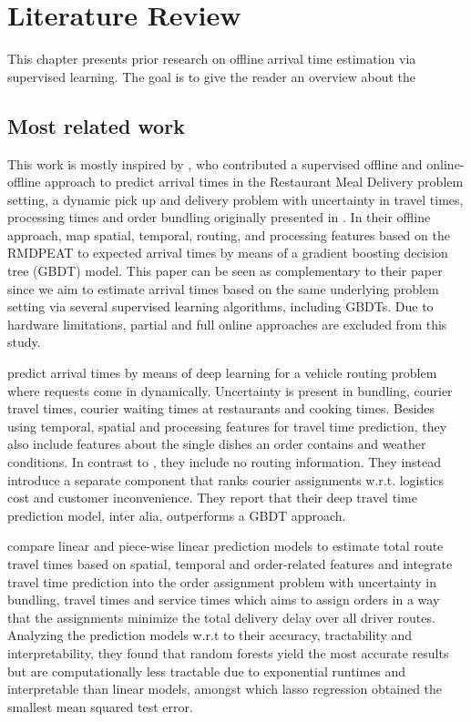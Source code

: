 \chapter{Literature Review}

This chapter presents prior research on offline arrival time estimation via supervised learning. The goal is to give the reader an overview about the  


\section{Most related work}
This work is mostly inspired by \cite{Hildebrandt2020_EAT}, who contributed a supervised offline and online-offline approach to predict arrival times in the Restaurant Meal Delivery problem setting, a dynamic pick up and delivery problem with uncertainty in travel times, processing times and order bundling originally  presented in \cite{UlmerRMDP}.
In their offline approach, \cite{Hildebrandt2020_EAT} map spatial, temporal, routing, and processing features based on the RMDPEAT to expected arrival times by means of a gradient boosting decision tree (GBDT) model. This paper can be seen as complementary to their paper since we aim to estimate arrival times based on the same underlying problem setting via several supervised learning algorithms, including GBDTs. Due to hardware limitations, partial and full online approaches are excluded from this study. 

\cite{Zhu2020_OFCTE_DL} predict arrival times by means of deep learning for a vehicle routing problem where requests come in dynamically. Uncertainty is present in bundling, courier travel times, courier waiting times at restaurants and cooking times. Besides using temporal, spatial and processing features for travel time prediction, they also include features about the single dishes an order contains and weather conditions. In contrast to \cite{Hildebrandt2020_EAT}, they include no routing information. They instead introduce a separate component that ranks courier assignments w.r.t. logistics cost and customer inconvenience. They report that their deep travel time prediction model, inter alia, outperforms a GBDT approach.

\cite{Liu2018_LM_PLM} compare linear and piece-wise linear prediction models to estimate total route travel times based on spatial, temporal and order-related features and integrate travel time prediction into the order assignment problem with uncertainty in bundling, travel times and service times which aims to assign orders in a way that the assignments minimize the total delivery delay over all driver routes. Analyzing the prediction models w.r.t to their accuracy, tractability and interpretability, they found that random forests yield the most accurate results but are computationally less tractable due to exponential runtimes and interpretable than linear models, amongst which lasso regression obtained the smallest mean squared test error.


